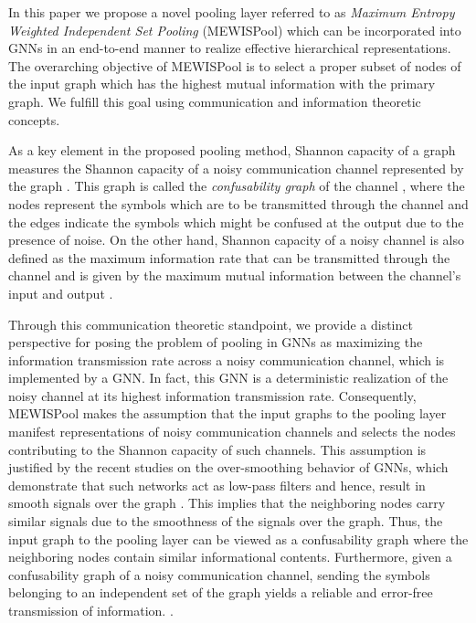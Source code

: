 \documentclass{article}
\begin{document}
In this paper we propose a novel pooling layer referred to as \textit{Maximum Entropy Weighted Independent Set Pooling} (MEWISPool) which can be incorporated into GNNs in an end-to-end manner to realize effective hierarchical representations. The overarching objective of MEWISPool is to select a proper subset of nodes of the input graph which has the highest mutual information with the primary graph. We fulfill this goal using communication and information theoretic concepts. 

As a key element in the proposed pooling method, Shannon capacity of a graph measures the Shannon capacity of a noisy communication channel represented by the graph \cite{shannon, lovasz}. This graph is called the \textit{confusability graph} of the channel \cite{confusability}, where the nodes represent the symbols which are to be transmitted through the channel and the edges indicate the symbols which might be confused at the output due to the presence of noise. On the other hand, Shannon capacity of a noisy channel is also defined as the maximum information rate that can be transmitted through the channel and is given by the maximum mutual information between the channel's input and output \cite{elements}.

Through this communication theoretic standpoint, we provide a distinct perspective for posing the problem of pooling in GNNs as maximizing the information transmission rate across a noisy communication channel, which is implemented by a GNN. In fact, this GNN is a deterministic realization of the noisy channel at its highest information transmission rate. Consequently, MEWISPool makes the assumption that the input graphs to the pooling layer manifest representations of noisy communication channels and selects the nodes contributing to the Shannon capacity of such channels. This assumption is justified by the recent studies on the over-smoothing behavior of GNNs, which demonstrate that such networks act as low-pass filters and hence, result in smooth signals over the graph \cite{oversmoothing, oversmoothing2, pairnorm, lowpass, fastgcn}. This implies that the neighboring nodes carry similar signals due to the smoothness of the signals over the graph. Thus, the input graph to the pooling layer can be viewed as a confusability graph where the neighboring nodes contain similar informational contents. Furthermore, given a confusability graph of a noisy communication channel, sending the symbols belonging to an independent set of the graph yields a reliable and error-free transmission of information. \cite{shannon}. 
\end{document}
